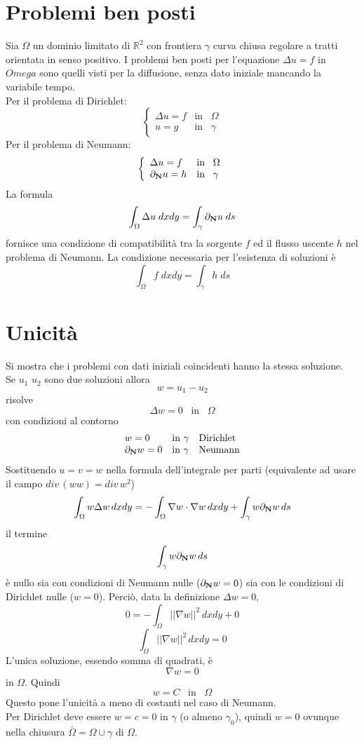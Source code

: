 \section{Problemi ben posti}
Sia $\Omega$ un dominio limitato di $\mathbb{R}^2$ con frontiera $\gamma$
curva chiusa regolare a tratti orientata in senso positivo.
I problemi ben posti per l'equazione $\Delta u= f$ in $Omega$ sono quelli
visti per la diffusione, senza dato iniziale mancando la variabile tempo.\\
Per il problema di Dirichlet:
\[
	\left\{
	\begin{array}{ll}
		\Delta u= f & \text{in} \;\;\; \Omega \\
		u= g & \text{in} \;\;\; \gamma
	\end{array}
	\right.
\]
Per il problema di Neumann:
\[
	\left\{
	\begin{array}{ll}
		\Delta u= f & \text{in} \;\;\; \Omega \\
		\partial_{\bf N}u= h & \text{in} \;\;\; \gamma
	\end{array}
	\right.
\]
La formula
\[
	\int_{\Omega} \Delta u \; dxdy=
	\int_{\gamma} \partial_{\bf N} u \; ds
\]
fornisce una condizione di compatibilit\`a tra la sorgente $f$ ed il flusso
uscente $h$ nel problema di Neumann. La condizione necessaria per l'esistenza
di soluzioni \`e
\[
	\int_{\Omega} f \; dxdy=
	\int_{\gamma} h \; ds
\]

\section{Unicit\`a}
Si mostra che i problemi con dati iniziali coincidenti hanno la stessa
soluzione.\\
Se $u_1$ $u_2$ sono due soluzioni allora
\[
	w=u_1- u_2
\]
risolve
\[
	\Delta w = 0 \;\;\; \text{in} \;\;\; \Omega
\]
con condizioni al contorno
\[
	\begin{array}{lll}
		w=0 & \text{in } \gamma & \text{Dirichlet}\\
		\partial_{\bf N}w=0 & \text{in } \gamma & \text{Neumann}\\
	\end{array}
\]
Sostituendo $u=v=w$ nella formula dell'integrale per parti
(equivalente ad usare il campo $div\, (ww)= div\, w^2$)
\[
	\int_{\Omega} w \Delta w \, dxdy=
	- \int_{\Omega} \nabla w \cdot \nabla w \, dxdy
	+ \int_{\gamma} w \partial_{\bf N} w \, ds
\]
il termine
\[
	\int_{\gamma} w \partial_{\bf N} w \, ds
\]
\`e nullo sia con condizioni di Neumann nulle ($\partial_{\bf N} w =0 $) sia
con le condizioni di Dirichlet nulle ($w=0$).
Perci\`o, data la definizione $\Delta w= 0$,
\[
	0= - \int_{\Omega} \left|\left| \nabla w \right|\right|^2 \, dxdy +0
\]
\[
	\int_{\Omega} \left|\left| \nabla w \right|\right|^2 \, dxdy = 0
\]
L'unica soluzione, essendo somma di quadrati, \`e
\[
	\nabla w=0
\]
in $\Omega$. Quindi
\[
	w=C \;\;\; \text{in} \;\;\; \Omega
\]
Questo pone l'unicit\`a a meno di costanti nel caso di Neumann.\\
Per Dirichlet deve essere $w=c=0$ in $\gamma$ (o almeno $\gamma_0$),
quindi $w=0$ ovunque nella chiusura $\bar{\Omega}= \Omega \cup \gamma$ di
$\Omega$.
